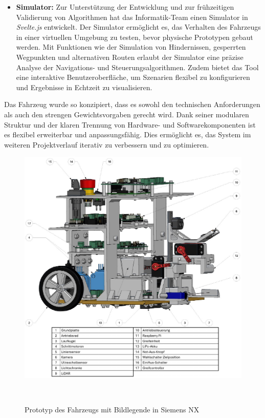 \documentclass[main.tex]{subfiles} %
\begin{document}
\begin{itemize}
    \item \textbf{Simulator:} Zur Unterstützung der Entwicklung und zur frühzeitigen Validierung von Algorithmen hat das Informatik-Team einen Simulator in \textit{Svelte.js} entwickelt. Der Simulator ermöglicht es, das Verhalten des Fahrzeugs in einer virtuellen Umgebung zu testen, bevor physische Prototypen gebaut werden. Mit Funktionen wie der Simulation von Hindernissen, gesperrten Wegpunkten und alternativen Routen erlaubt der Simulator eine präzise Analyse der Navigations- und Steuerungsalgorithmen. Zudem bietet das Tool eine interaktive Benutzeroberfläche, um Szenarien flexibel zu konfigurieren und Ergebnisse in Echtzeit zu visualisieren.
\end{itemize}

Das Fahrzeug wurde so konzipiert, dass es sowohl den technischen Anforderungen
als auch den strengen Gewichtsvorgaben gerecht wird. Dank seiner modularen
Struktur und der klaren Trennung von Hardware- und Softwarekomponenten ist es
flexibel erweiterbar und anpassungsfähig. Dies ermöglicht es, das System im
weiteren Projektverlauf iterativ zu verbessern und zu optimieren.

\begin{figure}[H]
    \centering
    \includegraphics[width=1\textwidth]{Baugruppe_Beschriftet.pdf}
    \caption{Prototyp des Fahrzeugs mit Bildlegende in Siemens NX}~\label{fig:Baugruppe_Beschriftet}
\end{figure}
\end{document}
